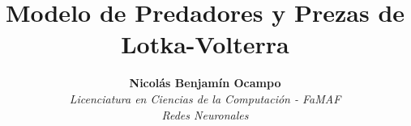 \documentclass[10pt,journal,compsoc]{IEEEtran}
\begin{document}
%
\title{Modelo de Predadores y Prezas de Lotka-Volterra}
%
%
%
%

\author{\textbf{Nicolás Benjamín Ocampo}\\
\textit{Licenciatura en Ciencias de la Computación - FaMAF}\\
\textit{Redes Neuronales}
}

%
%
\end{document}
